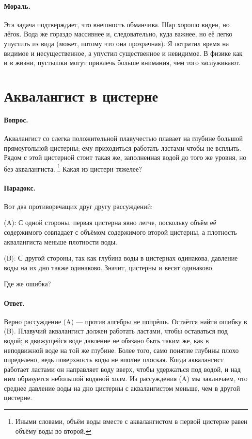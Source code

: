 \paragraph{Мораль.}
Эта задача подтверждает, что внешность обманчива.
Шар хорошо виден, но лёгок.
Вода же гораздо массивнее и, следовательно, куда важнее, но её легко упустить из вида (может, потому что она прозрачная).
Я потратил время на видимое и несущественное, а упустил существенное и невидимое.
В физике как и в жизни, пустышки могут привлечь больше внимания, чем того заслуживают.

\section{Аквалангист в цистерне}

\paragraph{Вопрос.}
Аквалангист со слегка положительной плавучестью плавает на глубине большой прямоугольной цистерны; ему приходиться работать ластами чтобы не всплыть.
Рядом с этой цистерной стоит такая же, заполненная водой до того же уровня, но без аквалангиста.%
\footnote{Иными словами, объём воды вместе с аквалангистом в первой цистерне равен объёму воды во второй.}
Какая из цистерн тяжелее?

\paragraph{Парадокс.} Вот два противоречащих друг другу рассуждений:

(A): С одной стороны, первая цистерна явно легче, поскольку объём её содержимого совпадает с объёмом содержимого второй цистерны, а плотность аквалангиста меньше плотности воды.

(B): С другой стороны, так как глубина воды в цистернах одинакова, давление воды на их дно также одинаково.
Значит, цистерны и весят одинаково.

Где же ошибка?

\paragraph{Ответ.}
Верно рассуждение (A) --- против алгебры не попрёшь.
Остаётся найти ошибку в (B).
Плавучий аквалангист должен работать ластами, чтобы оставаться под водой;
в движущейся воде давление не обязано быть таким же, как в неподвижной воде на той же глубине.%
Более того, само понятие глубины плохо определено, ведь поверхность воды не вполне плоская.
Когда аквалангист работает ластами он направляет воду вверх, чтобы удержаться под водой,
и над ним образуется небольшой водяной холм.
Из рассуждения (A) мы заключаем, что среднее давление воды на дно цистерны с аквалангистом меньше, чем в другой цистерне.

